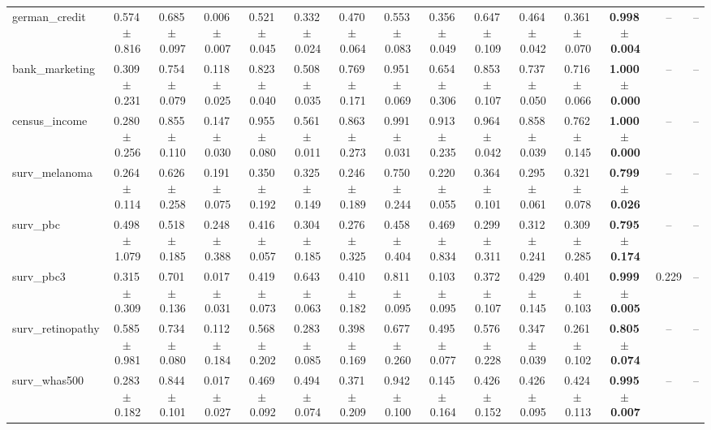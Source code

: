 \documentclass[8pt]{extarticle}
\begin{document}
\begin{longtable}{l*{14}{c}}
german\_credit & 0.574\,$\pm$\,0.816 & 0.685\,$\pm$\,0.097 & 0.006\,$\pm$\,0.007 & 0.521\,$\pm$\,0.045 & 0.332\,$\pm$\,0.024 & 0.470\,$\pm$\,0.064 & 0.553\,$\pm$\,0.083 & 0.356\,$\pm$\,0.049 & 0.647\,$\pm$\,0.109 & 0.464\,$\pm$\,0.042 & 0.361\,$\pm$\,0.070 & \textbf{0.998\,$\pm$\,0.004} & -- & -- \\
bank\_marketing & 0.309\,$\pm$\,0.231 & 0.754\,$\pm$\,0.079 & 0.118\,$\pm$\,0.025 & 0.823\,$\pm$\,0.040 & 0.508\,$\pm$\,0.035 & 0.769\,$\pm$\,0.171 & 0.951\,$\pm$\,0.069 & 0.654\,$\pm$\,0.306 & 0.853\,$\pm$\,0.107 & 0.737\,$\pm$\,0.050 & 0.716\,$\pm$\,0.066 & \textbf{1.000\,$\pm$\,0.000} & -- & -- \\
census\_income & 0.280\,$\pm$\,0.256 & 0.855\,$\pm$\,0.110 & 0.147\,$\pm$\,0.030 & 0.955\,$\pm$\,0.080 & 0.561\,$\pm$\,0.011 & 0.863\,$\pm$\,0.273 & 0.991\,$\pm$\,0.031 & 0.913\,$\pm$\,0.235 & 0.964\,$\pm$\,0.042 & 0.858\,$\pm$\,0.039 & 0.762\,$\pm$\,0.145 & \textbf{1.000\,$\pm$\,0.000} & -- & -- \\
surv\_melanoma & 0.264\,$\pm$\,0.114 & 0.626\,$\pm$\,0.258 & 0.191\,$\pm$\,0.075 & 0.350\,$\pm$\,0.192 & 0.325\,$\pm$\,0.149 & 0.246\,$\pm$\,0.189 & 0.750\,$\pm$\,0.244 & 0.220\,$\pm$\,0.055 & 0.364\,$\pm$\,0.101 & 0.295\,$\pm$\,0.061 & 0.321\,$\pm$\,0.078 & \textbf{0.799\,$\pm$\,0.026} & -- & -- \\
surv\_pbc & 0.498\,$\pm$\,1.079 & 0.518\,$\pm$\,0.185 & 0.248\,$\pm$\,0.388 & 0.416\,$\pm$\,0.057 & 0.304\,$\pm$\,0.185 & 0.276\,$\pm$\,0.325 & 0.458\,$\pm$\,0.404 & 0.469\,$\pm$\,0.834 & 0.299\,$\pm$\,0.311 & 0.312\,$\pm$\,0.241 & 0.309\,$\pm$\,0.285 & \textbf{0.795\,$\pm$\,0.174} & -- & -- \\
surv\_pbc3 & 0.315\,$\pm$\,0.309 & 0.701\,$\pm$\,0.136 & 0.017\,$\pm$\,0.031 & 0.419\,$\pm$\,0.073 & 0.643\,$\pm$\,0.063 & 0.410\,$\pm$\,0.182 & 0.811\,$\pm$\,0.095 & 0.103\,$\pm$\,0.095 & 0.372\,$\pm$\,0.107 & 0.429\,$\pm$\,0.145 & 0.401\,$\pm$\,0.103 & \textbf{0.999\,$\pm$\,0.005} & 0.229 & -- \\
surv\_retinopathy & 0.585\,$\pm$\,0.981 & 0.734\,$\pm$\,0.080 & 0.112\,$\pm$\,0.184 & 0.568\,$\pm$\,0.202 & 0.283\,$\pm$\,0.085 & 0.398\,$\pm$\,0.169 & 0.677\,$\pm$\,0.260 & 0.495\,$\pm$\,0.077 & 0.576\,$\pm$\,0.228 & 0.347\,$\pm$\,0.039 & 0.261\,$\pm$\,0.102 & \textbf{0.805\,$\pm$\,0.074} & -- & -- \\
surv\_whas500 & 0.283\,$\pm$\,0.182 & 0.844\,$\pm$\,0.101 & 0.017\,$\pm$\,0.027 & 0.469\,$\pm$\,0.092 & 0.494\,$\pm$\,0.074 & 0.371\,$\pm$\,0.209 & 0.942\,$\pm$\,0.100 & 0.145\,$\pm$\,0.164 & 0.426\,$\pm$\,0.152 & 0.426\,$\pm$\,0.095 & 0.424\,$\pm$\,0.113 & \textbf{0.995\,$\pm$\,0.007} & -- & -- \\

\end{longtable}
\end{document}
